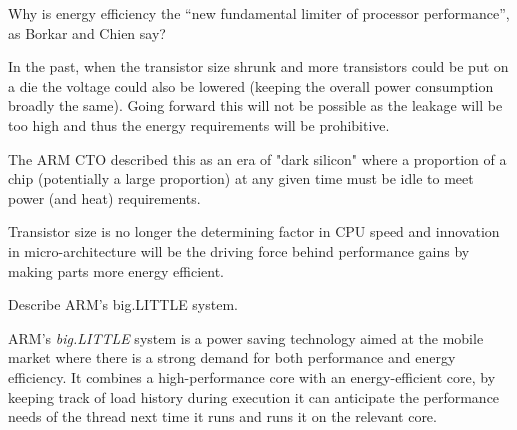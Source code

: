 \documentclass{supervision}
\begin{document}
\begin{questions}
    \question
    Why is energy efficiency the “new fundamental limiter of processor performance”, as Borkar and Chien say?
    \begin{solution}
    In the past, when the transistor size shrunk and more transistors could be put on a die the voltage could also be lowered (keeping the overall power consumption broadly the same). Going forward this will not be possible as the leakage will be too high and thus the energy requirements will be prohibitive. 
    
    The ARM CTO described this as an era of "dark silicon" where a proportion of a chip (potentially a large proportion) at any given time must be idle to meet power (and heat) requirements.
    
    Transistor size is no longer the determining factor in CPU speed and innovation in micro-architecture will be the driving force behind performance gains by making parts more energy efficient.
    \end{solution}

    \question
    Describe ARM’s big.LITTLE system.
    \begin{solution}
    ARM's \textit{big.LITTLE} system is a power saving technology aimed at the mobile market where there is a strong demand for both performance and energy efficiency. It combines a high-performance core with an energy-efficient core, by keeping track of load history during execution it can anticipate the performance needs of the thread next time it runs and runs it on the relevant core.
    \end{solution}

\end{questions}
\end{document}
